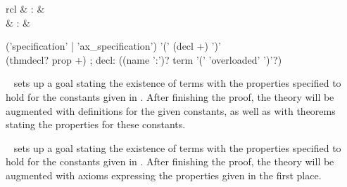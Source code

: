 \begin{isabellebody}
\begin{isamarkuptext}
\begin{description}
  \end{description}%
\end{isamarkuptext}%
\isamarkuptrue%
%
\isamarkuptrue%
%
\begin{isamarkuptext}%
\begin{matharray}{rcl}
    \hypertarget{command.HOL.specification}{\hyperlink{command.HOL.specification}{\mbox{}}} & : &  \\
    \hypertarget{command.HOL.ax-specification}{\hyperlink{command.HOL.ax-specification}{\mbox{}}} & : &  \\
  \end{matharray}

  \begin{rail}
  ('specification' | 'ax\_specification') '(' (decl +) ')' \\ (thmdecl? prop +)
  ;
  decl: ((name ':')? term '(' 'overloaded' ')'?)
  \end{rail}

  \begin{description}

  \item \hyperlink{command.HOL.specification}{\mbox{}}~ sets up a
  goal stating the existence of terms with the properties specified to
  hold for the constants given in .  After finishing the
  proof, the theory will be augmented with definitions for the given
  constants, as well as with theorems stating the properties for these
  constants.

  \item \hyperlink{command.HOL.ax-specification}{\mbox{}}~ sets up
  a goal stating the existence of terms with the properties specified
  to hold for the constants given in .  After finishing
  the proof, the theory will be augmented with axioms expressing the
  properties given in the first place.


\end{description}
\end{isamarkuptext}
\end{isabellebody}
